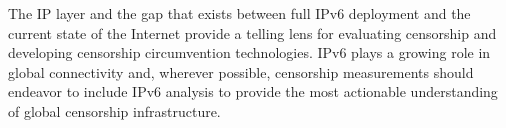 The IP layer and the gap that exists between full IPv6 deployment and the
current state of the Internet provide a telling lens for evaluating censorship
and developing censorship circumvention technologies. IPv6 plays a growing role
in global connectivity and, wherever possible, censorship measurements should
endeavor to include IPv6 analysis to provide the most actionable understanding
of global censorship infrastructure.
